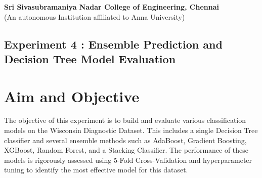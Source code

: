 \documentclass[12pt]{article}
\begin{document}
\begin{center}
    \large \textbf{Sri Sivasubramaniya Nadar College of Engineering, Chennai} \\
    (An autonomous Institution affiliated to Anna University) \\
    \vspace{1cm}
\end{center}

\begin{table}[H]
\renewcommand{\arraystretch}{1.5}
\end{table}

\vspace{1cm}

\begin{center}
 \section*{Experiment 4 : Ensemble Prediction and Decision Tree Model Evaluation}
\end{center}

\vspace{1cm}

\section{Aim and Objective}
The objective of this experiment is to build and evaluate various classification models on the Wisconsin Diagnostic Dataset. This includes a single Decision Tree classifier and several ensemble methods such as AdaBoost, Gradient Boosting, XGBoost, Random Forest, and a Stacking Classifier. The performance of these models is rigorously assessed using 5-Fold Cross-Validation and hyperparameter tuning to identify the most effective model for this dataset.
\end{document}
